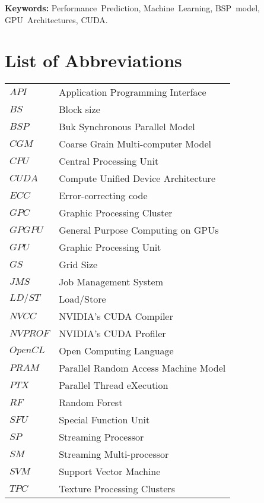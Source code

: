 \documentclass[openany,11pt,twoside,a4paper]{book}
\begin{document}
\noindent \textbf{Keywords:} Performance~Prediction, Machine~Learning,  BSP~model, GPU~Architectures, CUDA.

\tableofcontents

 
\chapter{List of Abbreviations}
\begin{tabular}{ll}
        $API$       & Application Programming Interface\\
        $BS$        & Block size\\
        $BSP$       & Buk Synchronous Parallel Model\\
        $CGM$       & Coarse Grain Multi-computer Model\\
        $CPU$       & Central Processing Unit\\
        $CUDA$      & Compute Unified Device Architecture\\
        $ECC$       & Error-correcting code \\
        $GPC$       & Graphic Processing Cluster\\
        $GPGPU$     & General Purpose Computing on GPUs\\
        $GPU$       & Graphic Processing Unit\\
        $GS$        & Grid Size\\
        $JMS$       & Job Management System\\
        $LD/ST$     & Load/Store\\
        $NVCC$      & NVIDIA's CUDA Compiler\\
        $NVPROF$    & NVIDIA's CUDA Profiler\\
        $OpenCL$    & Open Computing Language\\
        $PRAM$      & Parallel Random Access Machine Model\\
        $PTX$	    & Parallel Thread eXecution\\
        $RF$        & Random Forest\\  
        $SFU$       & Special Function Unit\\
        $SP$        & Streaming Processor\\
        $SM$        & Streaming Multi-processor\\
        $SVM$       & Support Vector Machine\\
        $TPC$       & Texture Processing Clusters
\end{tabular}
\end{document}
